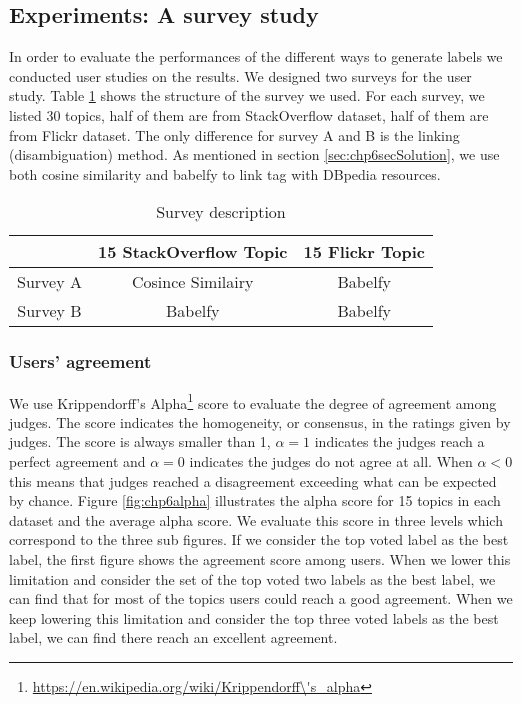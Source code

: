 \subsection{Experiments: A survey study}
In order to evaluate the performances of the different ways to generate labels we conducted user studies on the results. We designed two surveys for the user study. Table \ref{tab:chp6survey} shows the structure of the survey we used. For each survey, we listed 30 topics, half of them are from StackOverflow dataset, half of them are from Flickr dataset. The only difference for survey A and B is the linking (disambiguation) method. As mentioned in section \ref{sec:chp6secSolution}, we use both cosine similarity and babelfy to link tag with DBpedia resources. 

\begin{table}[htp]
\caption{Survey description}
\label{tab:chp6survey}
\centering
\begin{tabular}{c|c|c}
\hline
             &  15 StackOverflow Topic& 15 Flickr Topic \\ \hline
    Survey A & Cosince Similairy & Babelfy\\ \hline  
    Survey B &  Babelfy          & Babelfy\\ \hline
\end{tabular}

\end{table}


\subsubsection{Users' agreement}
We use Krippendorff's Alpha\footnote{\url{https://en.wikipedia.org/wiki/Krippendorff\'s_alpha}} score to evaluate the degree of agreement among judges. The score indicates the homogeneity, or consensus, in the ratings given by judges. The score is always smaller than 1, $\alpha = 1 $ indicates the judges reach a perfect agreement and $\alpha =0 $ indicates the judges do not agree at all. When $\alpha <0 $ this means that judges reached a disagreement exceeding what can be expected by chance.  Figure \ref{fig:chp6alpha} illustrates the alpha score for 15 topics in each dataset and the average alpha score. We evaluate this score in three levels which correspond to the three sub figures. If we consider the top voted label as the best label, the first figure shows the agreement score among users. When we lower this limitation and consider the set of the top voted two labels as the best label, we can find that for most of the topics users could reach a good agreement. When we keep lowering this limitation and consider the top three voted labels as the best label, we can find there reach an excellent agreement. 




